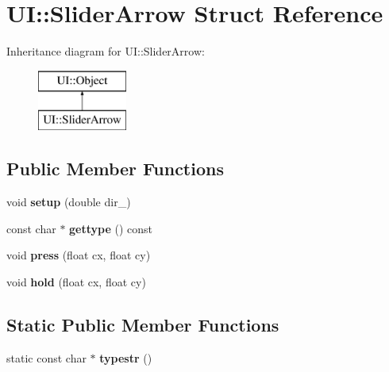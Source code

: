 \hypertarget{struct_u_i_1_1_slider_arrow}{}\section{UI\+:\+:Slider\+Arrow Struct Reference}
\label{struct_u_i_1_1_slider_arrow}
Inheritance diagram for UI\+:\+:Slider\+Arrow\+:\begin{figure}[H]
\begin{center}
\leavevmode
\includegraphics[height=2.000000cm]{struct_u_i_1_1_slider_arrow}
\end{center}
\end{figure}
\subsection*{Public Member Functions}
\begin{DoxyCompactItemize}
\item 
\mbox{\label{struct_u_i_1_1_slider_arrow_ae10a93f957b97087fa8c30a62efa9f7b}} 
void {\bfseries setup} (double dir\+\_)
\item 
\mbox{\label{struct_u_i_1_1_slider_arrow_ab77c14c02a8e8fd947399ae8aedbff1f}} 
const char $\ast$ {\bfseries gettype} () const
\item 
\mbox{\label{struct_u_i_1_1_slider_arrow_a3920889fdc3d03a46e57a7f43849eb3a}} 
void {\bfseries press} (float cx, float cy)
\item 
\mbox{\label{struct_u_i_1_1_slider_arrow_a3d39303a25834d252123e78336c03e36}} 
void {\bfseries hold} (float cx, float cy)
\end{DoxyCompactItemize}
\subsection*{Static Public Member Functions}
\begin{DoxyCompactItemize}
\item 
\mbox{\label{struct_u_i_1_1_slider_arrow_a12b8f77fa846be97aeb75007ff4b7ced}} 
static const char $\ast$ {\bfseries typestr} ()
\end{DoxyCompactItemize}
